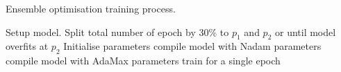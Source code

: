 \begin{algorithm}[H]%
  \caption{Ensemble optimisation training process.}
  \begin{algorithmic}[1]
    \STATE Setup model. Split total number of epoch by 30\% to $p_{1}$ and $p_{2}$ or until model overfits at $p_{2}$
    \STATE Initialise parameters
        \STATE {}
        \STATE compile model with Nadam parameters 
      \ELSE
        \STATE {}
        \STATE compile model with AdaMax parameters 
      \ENDIF
    \STATE train for a single epoch
    \ENDWHILE
  \end{algorithmic}
  \label{alg:ENS}
\end{algorithm}

%
%
